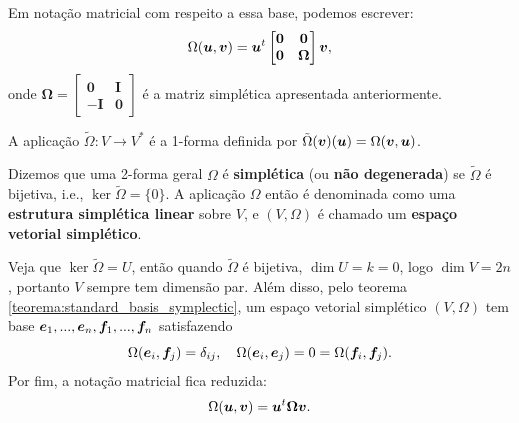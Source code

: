 \begin{observation}
    Em notação matricial com respeito a essa base, podemos escrever:
    \begin{equation*}
        \Omega(\bm u,\bm v) = \bm u^t \begin{bmatrix}
            \bm 0 & \bm 0 \\ \bm 0 & \bm \Omega
        \end{bmatrix}
        \bm v,
    \end{equation*}
    onde $\bm \Omega = \begin{bmatrix}
        \bm 0 & \bm I \\ - \bm I & \bm 0
    \end{bmatrix}$ é a matriz simplética apresentada anteriormente.
\end{observation}

\begin{definition}
    A aplicação $\tilde \Omega: V \to V^*$ é a 1-forma definida por $\tilde \Omega (\bm v)(\bm u) = \Omega(\bm v,\bm u)$.
\end{definition}

\begin{definition}
    Dizemos que uma 2-forma geral $\Omega$ é \textbf{simplética} (ou \textbf{não degenerada}) se $\tilde \Omega$ é bijetiva, i.e., $\ker \tilde \Omega = \{0\}$. A aplicação $\Omega$ então é denominada como uma \textbf{estrutura simplética linear} sobre $V$, e $(V, \Omega)$ é chamado um \textbf{espaço vetorial simplético}.
\end{definition}

\begin{observation}
    Veja que $\ker \tilde \Omega = U$, então quando $\tilde \Omega$ é bijetiva, $\dim U = k = 0$, logo $\dim V = 2n$, portanto $V$ sempre tem dimensão par. Além disso, pelo teorema \ref{teorema:standard_basis_symplectic}, um espaço vetorial simplético $(V, \Omega)$ tem base $\bm e_1, ..., \bm e_n, \bm f_1, ..., \bm f_n$ satisfazendo
    \begin{equation*}
        \Omega(\bm e_i, \bm f_j) = \delta_{ij}, \quad \Omega(\bm e_i,\bm e_j) = 0 = \Omega(\bm f_i,\bm f_j).
    \end{equation*}
    Por fim, a notação matricial fica reduzida:
    \begin{equation*}
        \Omega(\bm u,\bm v) = \bm u^t \bm \Omega \bm v.
    \end{equation*}
\end{observation}

